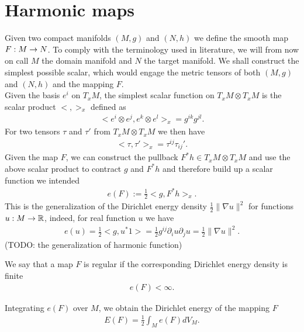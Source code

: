 \section{Harmonic maps}
\label{sec:preliminaries}

Given two compact manifolds $(M,g)$ and $(N,h)$ we define the smooth
map $F:M\rightarrow N$. To comply with the terminology used in literature, we
will from now on call $M$ the domain manifold and $N$ the target
manifold. We shall construct the simplest possible scalar,
which would engage the metric tensors of both $(M,g)$ and $(N,h)$ and the mapping $F$.\\
Given the basis $e^i$ on $T_x M$, the simplest scalar function on $T_x
M\otimes T_x M$ is the scalar product $<,>_x$ defined as
\begin{align}
  \label{eq:25}
  <e^i\otimes e^j,e^k\otimes e^l>_x=g^{ik}g^{jl}.
\end{align}
For two tensors $\tau$ and $\tau'$ from $T_x M\otimes T_x M$ we then
have
\begin{align}
  \label{eq:26}
  <\tau,\tau'>_x=\tau^{ij}\tau_{ij}'.
\end{align}
Given the map $F$, we can construct the pullback $F^*h\in T_x M\otimes
T_x M$ and use the above scalar product to contract $g$ and $F^* h$
and therefore build up a scalar function we intended
\begin{align}
  \label{eq:28}
  e(F):=\frac{1}{2}<g,F^*h>_x.
\end{align}
This is the generalization of the Dirichlet energy density
$\frac{1}{2}\lVert\nabla u\rVert^2$ for functions $u:M\rightarrow\mathbb{R}$,
indeed, for real function $u$ we have
\begin{align}
  \label{eq:29}
  e(u)=\frac{1}{2}<g,u^*1>=\frac{1}{2}g^{ij}\partial_i u\partial_j u
  =\frac{1}{2}\lVert\nabla u\rVert^2.
\end{align}
(TODO: the generalization of harmonic function)
\begin{definition}\label{def:regular-map}
  We say that a map $F$ is regular if the corresponding Dirichlet
  energy density is finite
  \begin{align}
    \label{eq:34}
    e(F)<\infty.
  \end{align}
\end{definition}

Integrating $e(F)$ over $M$, we obtain the Dirichlet energy of the
mapping $F$
\begin{align}\label{eq:En_general}
  E(F)=\frac{1}{2}\int_M e(F)dV_M.
\end{align}

